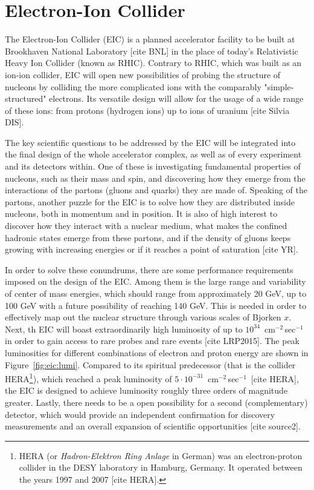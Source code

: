 \chapter{Electron-Ion Collider}\label{cha:EIC} %

The Electron-Ion Collider (EIC) is a planned accelerator facility to be built at Brookhaven National Laboratory [cite BNL] in the place of today's Relativistic Heavy Ion Collider (known as RHIC). Contrary to RHIC, which was built as an ion-ion collider, EIC will open new possibilities of probing the structure of nucleons by colliding the more complicated ions  with the comparably "simple-structured" electrons. Its versatile design will allow for the usage of a wide range of these ions: from protons (hydrogen ions) up to ions of uranium [cite Silvia DIS].

The key scientific questions to be addressed by the EIC will be integrated into the final design of the whole accelerator complex, as well as of every experiment and its detectors within. One of these is investigating fundamental properties of nucleons, such as their mass and spin, and discovering how they emerge from the interactions of the partons (gluons and quarks) they are made of. Speaking of the partons, another puzzle for the EIC is to solve how they are distributed inside nucleons, both in momentum and in position. It is also of high interest to discover how they interact with a nuclear medium, what makes the confined hadronic states emerge from these partons, and if the density of gluons keeps growing with increasing energies or if it reaches a point of saturation [cite YR].

In order to solve these conundrums, there are some performance requirements imposed on the design of the EIC. Among them is the large range and variability of center of mass energies, which should range from approximately 20 GeV, up to 100 GeV with a future possibility of reaching 140 GeV. This is needed in order to effectively map out the nuclear structure through various scales of Bjorken $x$. Next, th EIC will boast extraordinarily high luminosity of up to $10^{34}$~cm$^{-2}$\,sec$^{-1}$ in order to gain access to rare probes and rare events [cite LRP2015]. The peak luminosities for different combinations of electron and proton energy are shown in Figure~\ref{fig:eic:lumi}. Compared to its spiritual predecessor (that is the collider HERA\footnote{HERA (or \emph{Hadron-Elektron Ring Anlage} in German) was an electron-proton collider in the DESY laboratory in Hamburg, Germany. It operated between the years 1997 and 2007 [cite HERA].}), which reached a peak luminosity of $5 \cdot 10^{-31}$~cm$^{-2}$\,sec$^{-1}$~[cite HERA], the EIC is designed to achieve luminosity roughly three orders of magnitude greater. Lastly, there needs to be a open possibility for a second (complementary) detector, which would provide an independent confirmation for discovery measurements and an overall expansion of scientific opportunities [cite source2].

